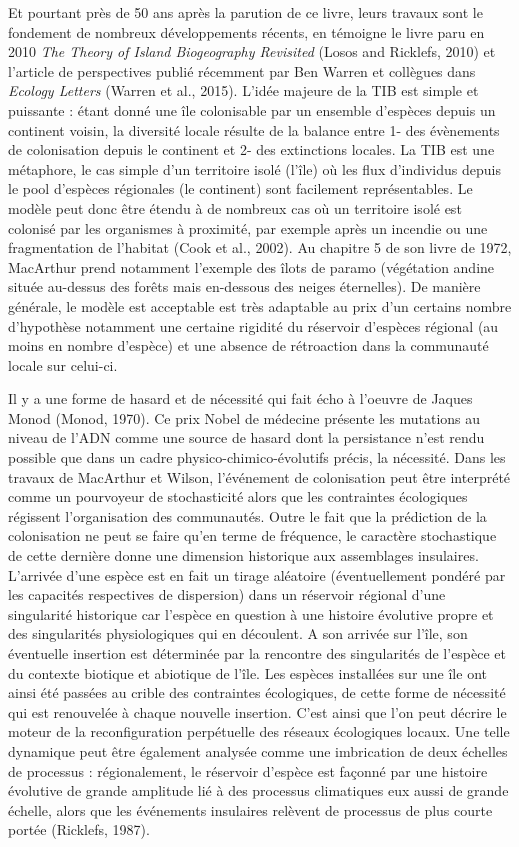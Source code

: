 Et pourtant près de 50 ans après la parution de ce livre, leurs travaux
sont le fondement de nombreux développements récents, en témoigne le
livre paru en 2010 \emph{The Theory of Island Biogeography Revisited}
(Losos and Ricklefs, 2010) et l'article de perspectives publié récemment
par Ben Warren et collègues dans \emph{Ecology Letters} (Warren et al.,
2015). L'idée majeure de la TIB est simple et puissante : étant donné
une île colonisable par un ensemble d'espèces depuis un continent
voisin, la diversité locale résulte de la balance entre 1- des
évènements de colonisation depuis le continent et 2- des extinctions
locales. La TIB est une métaphore, le cas simple d'un territoire isolé
(l'île) où les flux d'individus depuis le pool d'espèces régionales (le
continent) sont facilement représentables. Le modèle peut donc être
étendu à de nombreux cas où un territoire isolé est colonisé par les
organismes à proximité, par exemple après un incendie ou une
fragmentation de l'habitat (Cook et al., 2002). Au chapitre 5 de son
livre de 1972, MacArthur prend notamment l'exemple des îlots de paramo
(végétation andine située au-dessus des forêts mais en-dessous des
neiges éternelles). De manière générale, le modèle est acceptable est
très adaptable au prix d'un certains nombre d'hypothèse notamment une
certaine rigidité du réservoir d'espèces régional (au moins en nombre
d'espèce) et une absence de rétroaction dans la communauté locale sur
celui-ci.

Il y a une forme de hasard et de nécessité qui fait écho à l'oeuvre de
Jaques Monod (Monod, 1970). Ce prix Nobel de médecine présente les
mutations au niveau de l'ADN comme une source de hasard dont la
persistance n'est rendu possible que dans un cadre
physico-chimico-évolutifs précis, la nécessité. Dans les travaux de
MacArthur et Wilson, l'événement de colonisation peut être interprété
comme un pourvoyeur de stochasticité alors que les contraintes
écologiques régissent l'organisation des communautés. Outre le fait que
la prédiction de la colonisation ne peut se faire qu'en terme de
fréquence, le caractère stochastique de cette dernière donne une
dimension historique aux assemblages insulaires. L'arrivée d'une espèce
est en fait un tirage aléatoire (éventuellement pondéré par les
capacités respectives de dispersion) dans un réservoir régional d'une
singularité historique car l'espèce en question à une histoire évolutive
propre et des singularités physiologiques qui en découlent. A son
arrivée sur l'île, son éventuelle insertion est déterminée par la
rencontre des singularités de l'espèce et du contexte biotique et
abiotique de l'île. Les espèces installées sur une île ont ainsi été
passées au crible des contraintes écologiques, de cette forme de
nécessité qui est renouvelée à chaque nouvelle insertion. C'est ainsi
que l'on peut décrire le moteur de la reconfiguration perpétuelle des
réseaux écologiques locaux. Une telle dynamique peut être également
analysée comme une imbrication de deux échelles de processus :
régionalement, le réservoir d'espèce est façonné par une histoire
évolutive de grande amplitude lié à des processus climatiques eux aussi
de grande échelle, alors que les événements insulaires relèvent de
processus de plus courte portée (Ricklefs, 1987).


